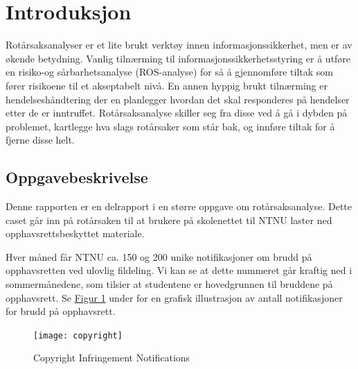 \chapter{Introduksjon}
Rotårsaksanalyser er et lite brukt verktøy innen informasjonssikkerhet, men er av økende betydning. Vanlig tilnærming til informasjonssikkerhetsstyring er å utføre en risiko-og sårbarhetsanalyse (ROS-analyse) for så å gjennomføre tiltak som fører risikoene til et akseptabelt nivå. En annen hyppig brukt tilnærming er hendelseshåndtering der en planlegger hvordan det skal responderes på hendelser etter de er inntruffet. Rotårsaksanalyse skiller seg fra disse ved å gå i dybden på problemet, kartlegge hva slags rotårsaker som står bak, og innføre tiltak for å fjerne disse helt.

\section{Oppgavebeskrivelse}
Denne rapporten er en delrapport i en større oppgave om rotårsaksanalyse. Dette caset går inn på rotårsaken til at brukere på skolenettet til NTNU laster ned opphavsrettsbeskyttet materiale.

Hver måned får NTNU ca. 150 og 200 unike notifikasjoner om brudd på opphavsretten ved ulovlig fildeling. Vi kan se at dette nummeret går kraftig ned i sommermånedene, som tilsier at studentene er hovedgrunnen til bruddene på opphavsrett. Se \hyperref[fig:copyright]{Figur 1} under for en grafisk illustrasjon av antall notifikasjoner for brudd på opphavsrett.

\begin{figure}[H]
    \centering
    \texttt{[image: copyright]}
    \label{fig:copyright}
    \caption[Copyright Infringement Notifications]{Copyright Infringement Notifications}
\end{figure}

